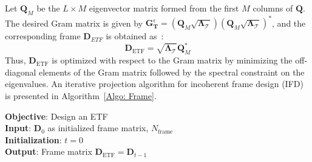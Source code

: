 Let $\bm{Q}_{M}$ be the $L\times M$ eigenvector matrix formed from the first $M$ columns of $\bm{Q}$. The desired Gram matrix is given by $\bm{G}_{\mathcal{\bm{T}}}^{\epsilon} = (\bm{Q}_{M} \sqrt{\bm{\Lambda}_{\bm{\mathcal{T}}}}) (\bm{Q}_{M} \sqrt{\bm{\Lambda}_{\bm{\mathcal{T}}}})^{*}$, and the corresponding frame $\bm{D}_{ETF}$ is obtained as~\cite{Frame}:
\begin{equation}
    \label{eq: Optimal_frame}
    \bm{D}_{\text{ETF}} = \sqrt{\bm{\Lambda}_{\bm{\mathcal{T}}}} \bm{Q}_{M}^{*}
\end{equation}
Thus, $\bm{D}_{\text{ETF}}$ is optimized with respect to the Gram matrix by minimizing the off-diagonal elements of the Gram matrix followed by the spectral constraint on the eigenvalues.
An iterative projection algorithm for incoherent frame design (IFD) is presented in Algorithm~\ref{Algo: Frame}. 
\begin{algorithm}
\SetAlgoLined
\textbf{Objective}: Design an ETF\\
\textbf{Input}: $\bm{D}_{0}$ as initialized frame matrix, $N_{\text{frame}}$ \\
\textbf{Initialization}: $t=0$\\
%
\textbf{Output}: Frame matrix $\bm{D}_{\text{ETF}}=\bm{D}_{t-1}$
\caption{Incoherent frame design (IFD)}
\label{Algo: Frame}
\end{algorithm}


